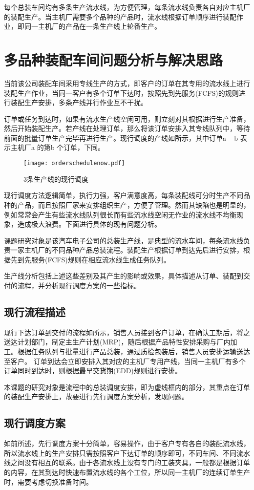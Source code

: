 每个总装车间均有多条生产流水线，为方便管理，每条流水线负责各自对应主机厂的装配生产。当主机厂需要多个品种的产品时，流水线根据订单顺序进行装配作业，即同一主机厂的产品在一条生产线上轮番生产。

\section{多品种装配车间问题分析与解决思路}
当前该公司装配车间采用专线生产的方式，即客户的订单在其专用的流水线上进行装配生产作业，当同一客户有多个订单下达时，按照先到先服务(FCFS)的规则进行装配生产安排，多条产线并行作业互不干扰。

订单或任务到达时，如果有流水生产线空闲可用，则立刻对其根据进行生产准备，然后开始装配生产。若产线在处理订单，那么将该订单安排入其专线队列中，等待前面的批量订单生产完毕再进行生产。现行调度的产线如所示，其中订单a -- b 表示主机厂a 的第b 个订单，下同。
\begin{figure}[h]
\caption{$3$条生产线的现行调度\label{fig:3nowschedule}}\texttt{[image: orderschedulenow.pdf]}
\end{figure}

现行调度方法逻辑简单，执行力强，客户满意度高，每条装配线可分时生产不同品种的产品，而且按照厂家来安排组织生产，方便了管理。然而其缺陷也是明显的，例如常常会产生有些流水线队列很长而有些流水线空闲无作业的流水线不均衡现象，造成极大浪费。下面进行具体的现有问题分析。

课题研究对象是该汽车电子公司的总装生产线，是典型的流水车间，每条流水线负责一家主机厂的不同品种产品总装流程。装配生产根据订单到达先后进行安排，根据先到先服务(FCFS)规则在相应流水线生成任务队列。

生产线分析包括上述这些差别及其产生的影响或效果，具体描述从订单、装配到交付的流程，并分析现行调度方案的一些指标。

\subsection{现行流程描述}
现行下达订单到交付的流程如所示，销售人员接到客户订单，在确认工期后，将之送达计划部门，制定主生产计划(MRP)，随后根据产品特性安排采购与厂内加工。根据任务队列与批量进行产品总装，通过质检包装后，销售人员安排运输送达至客户。
订单到达会立即安排入其对应的主机厂专用产线，当同一主机厂有多个订单同时到达时，则根据最早交货期(EDD)规则进行安排。

本课题的研究对象是流程中的总装调度安排，即为虚线框内的部分，其重点在订单的装配生产安排上，故要进行先行调度方案分析，发现问题。
\subsection{现行调度方案}
如前所述，先行调度方案十分简单，容易操作，由于客户专有各自的装配流水线，所以流水线上的生产安排只需按照客户下达订单的顺序即可，不同车间、不同流水线之间没有相互的联系。由于各流水线上没有专门的工装夹具，一般都是根据订单的内容，在其到达时快速布置流水线的各个工位，所以同一主机厂的连续订单生产时，需要考虑切换准备时间。


